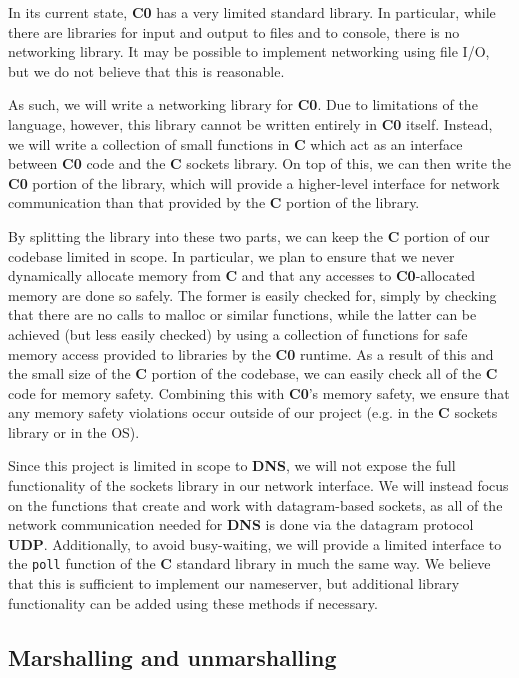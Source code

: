 \documentclass{article}
\newcommand\Kwd[1]{{\sffamily\bfseries{#1}}}
\begin{document}
In its current state, \Kwd{C0} has a very limited standard library. In particular, while there are libraries for input and output to files and to console, there is no networking library. It may be possible to implement networking using file I/O, but we do not believe that this is reasonable.

As such, we will write a networking library for \Kwd{C0}. Due to limitations of the language, however, this library cannot be written entirely in \Kwd{C0} itself. Instead, we will write a collection of small functions in \Kwd{C} which act as an interface between \Kwd{C0} code and the \Kwd{C} sockets library. On top of this, we can then write the \Kwd{C0} portion of the library, which will provide a higher-level interface for network communication than that provided by the \Kwd{C} portion of the library.

By splitting the library into these two parts, we can keep the \Kwd{C} portion of our codebase limited in scope. In particular, we plan to ensure that we never dynamically allocate memory from \Kwd{C} and that any accesses to \Kwd{C0}-allocated memory are done so safely. The former is easily checked for, simply by checking that there are no calls to malloc or similar functions, while the latter can be achieved (but less easily checked) by using a collection of functions for safe memory access provided to libraries by the \Kwd{C0} runtime. As a result of this and the small size of the \Kwd{C} portion of the codebase, we can easily check all of the \Kwd{C} code for memory safety. Combining this with \Kwd{C0}'s memory safety, we ensure that any memory safety violations occur outside of our project (e.g. in the \Kwd{C} sockets library or in the OS).

Since this project is limited in scope to \Kwd{DNS}, we will not expose the full functionality of the sockets library in our network interface. We will instead focus on the functions that create and work with datagram-based sockets, as all of the network communication needed for \Kwd{DNS} is done via the datagram protocol \Kwd{UDP}. Additionally, to avoid busy-waiting, we will provide a limited interface to the \texttt{poll} function of the \Kwd{C} standard library in much the same way. We believe that this is sufficient to implement our nameserver, but additional library functionality can be added using these methods if necessary.

\subsection{Marshalling and unmarshalling}
\end{document}
